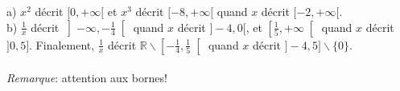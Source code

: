 a) $x^2$ décrit $[0,+\infty[$ et $x^3$ décrit $[-8,+\infty[$ quand $x$ décrit $[-2,+\infty[$.\\
b) $\frac{1}{x}$ décrit $\left]-\infty, -\frac{1}{4}\right[$ quand $x$ décrit $]-4,0[$, et $\left[\frac{1}{5}, +\infty \right[$ quand $x$ décrit $]0,5]$. Finalement, $\frac{1}{x}$ décrit $\mathbb{R}\backslash\left[-\frac{1}{4},\frac{1}{5}\right[$ quand $x$ décrit $]-4,5]\backslash \lbrace 0 \rbrace$.\\ \\
\textit{Remarque}: attention aux bornes!
